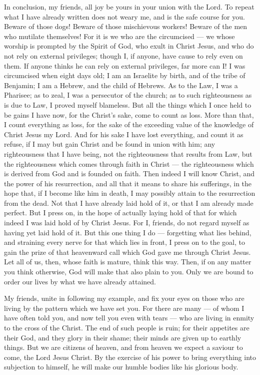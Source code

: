  In conclusion, my friends, all joy be yours in your union
with the Lord. To repeat what I have already written does not weary me,
and is the safe course for you.  Beware of those dogs!
Beware of those mischievous workers! Beware of the men who mutilate
themselves!  For it is we who are the circumcised --- we
whose worship is prompted by the Spirit of God, who exult in Christ
Jesus, and who do not rely on external privileges;  though
I, if anyone, have cause to rely even on them. If anyone thinks he can
rely on external privileges, far more can I!  I was
circumcised when eight days old; I am an Israelite by birth, and of the
tribe of Benjamin; I am a Hebrew, and the child of Hebrews. As to the
Law, I was a Pharisee;  as to zeal, I was a persecutor of
the church; as to such righteousness as is due to Law, I proved myself
blameless.  But all the things which I once held to be gains
I have now, for the Christ's sake, come to count as loss. 
More than that, I count everything as loss, for the sake of the
exceeding value of the knowledge of Christ Jesus my Lord. And for his
sake I have lost everything, and count it as refuse, if I may but gain
Christ and be found in union with him;  any righteousness
that I have being, not the righteousness that results from Law, but the
righteousness which comes through faith in Christ --- the righteousness
which is derived from God and is founded on faith.  Then
indeed I will know Christ, and the power of his resurrection, and all
that it means to share his sufferings,  in the hope that,
if I become like him in death, I may possibly attain to the resurrection
from the dead.  Not that I have already laid hold of it, or
that I am already made perfect. But I press on, in the hope of actually
laying hold of that for which indeed I was laid hold of by Christ Jesus.
 For I, friends, do not regard myself as having yet laid
hold of it. But this one thing I do --- forgetting what lies behind, and
straining every nerve for that which lies in front,  I
press on to the goal, to gain the prize of that heavenward call which
God gave me through Christ Jesus.  Let all of us, then,
whose faith is mature, think this way. Then, if on any matter you think
otherwise, God will make that also plain to you.  Only we
are bound to order our lives by what we have already attained.

 My friends, unite in following my example, and fix your
eyes on those who are living by the pattern which we have set you.
 For there are many --- of whom I have often told you, and
now tell you even with tears --- who are living in enmity to the cross
of the Christ.  The end of such people is ruin; for their
appetites are their God, and they glory in their shame; their minds are
given up to earthly things.  But we are citizens of heaven,
and from heaven we expect a saviour to come, the Lord Jesus Christ.
 By the exercise of his power to bring everything into
subjection to himself, he will make our humble bodies like his glorious
body.

